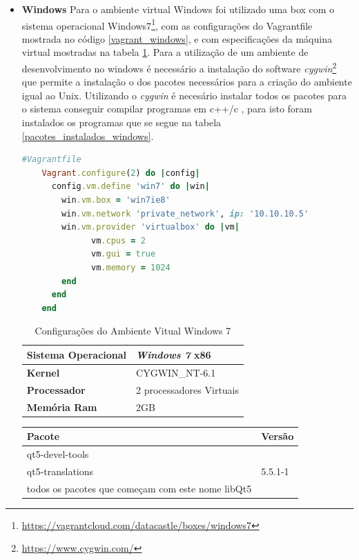 \begin{itemize}
    \item \textbf{Windows}
        \subitem Para o ambiente virtual Windows foi utilizado uma box com
 o sistema operacional Windows7\footnote{\url{https://vagrantcloud.com/datacastle/boxes/windows7}},
 com as configurações do Vagrantfile mostrada no código \ref{vagrant_windows},
 e com especificações da máquina virtual mostradas na tabela \ref{especificacoes_windows}.
 Para a utilização de um ambiente de desenvolvimento no windows é necessário a instalação
 do software \textit{cygwin}\footnote{\url{https://www.cygwin.com/}} que permite a instalação
o dos pacotes necessários para a criação do ambiente igual ao Unix.
 Utilizando o \textit{cygwin} é necesário instalar todos os pacotes para o sistema 
conseguir compilar programas em c++/c , para isto foram instalados os programas 
que se segue na tabela \ref{pacotes_instalados_windows}.

\begin{lstlisting}[language=ruby, caption={Vagrantfile com configurações da máquina virtual Windows 7},
                  label=vagrant_windows]
    #Vagrantfile
    Vagrant.configure(2) do |config|
      config.vm.define 'win7' do |win|
        win.vm.box = 'win7ie8'
        win.vm.network 'private_network', ip: '10.10.10.5'
        win.vm.provider 'virtualbox' do |vm|
              vm.cpus = 2
              vm.gui = true
              vm.memory = 1024
        end
      end
    end
\end{lstlisting}

\begin{table}[h]
\centering
\begin{tabular}{ll}
\textbf{Sistema Operacional} & \textit{Windows 7} x86\\ \toprule
\textbf{Kernel} & CYGWIN\_NT-6.1  \\ \midrule 
\textbf{Processador} & 2 processadores Virtuais \\ \midrule
\textbf{Memória Ram} & 2GB  \\ \bottomrule 
\end{tabular} 
\caption{Configurações do Ambiente Vitual Windows 7}
\label{especificacoes_windows}
\end{table}


\begin{table}[h]
\centering
\begin{tabular}{ll}
\textbf{Pacote} & \textbf{Versão} \\ \toprule
qt5-devel-tools  &  \\ 
qt5-translations & 5.5.1-1  \\ 
todos os pacotes que começam com este nome libQt5 & \\ \midrule


\end{tabular}
\end{table}
\end{itemize}
